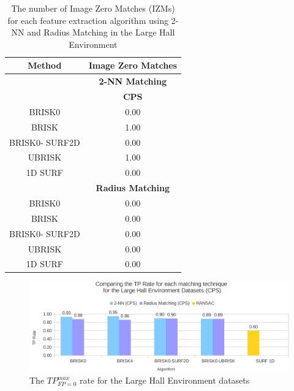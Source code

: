 \begin{table}
\centering
\caption{The number of Image Zero Matches (IZMs) for each feature extraction
algorithm using 2-NN and Radius Matching in the Large Hall Environment}


\begin{tabular}{|c|c|}
\hline 
\textbf{Method} & \multicolumn{1}{c|}{\textbf{Image Zero Matches}}\tabularnewline
\hline 
 & \multicolumn{1}{c|}{\textbf{2-NN Matching}}\tabularnewline
\hline 
 & \textbf{CPS}\tabularnewline
\hline 
\hline 
BRISK0 & 0.00\tabularnewline
\hline 
BRISK & 1.00\tabularnewline
\hline 
BRISK0- SURF2D & 0.00\tabularnewline
\hline 
UBRISK & 1.00\tabularnewline
\hline 
1D SURF & 0.00\tabularnewline
\hline 
 & \multicolumn{1}{c|}{\textbf{Radius Matching}}\tabularnewline
\hline 
BRISK0 & 0.00\tabularnewline
\hline 
BRISK & 0.00\tabularnewline
\hline 
BRISK0- SURF2D & 0.00\tabularnewline
\hline 
UBRISK & 0.00\tabularnewline
\hline 
1D SURF & 0.00\tabularnewline
\hline 
\end{tabular}
\label{app:lh_izm}
\end{table}


\begin{figure}
  \centering
    \includegraphics[width=1.0\textwidth]{../Drawings/Graphs/tp_rate_lh_cps.pdf}
    \caption{The $TP_{FP=0}^{max}$ rate for the Large Hall Environment datasets} 
    \label{app:tp_rate_lh}
\end{figure}
